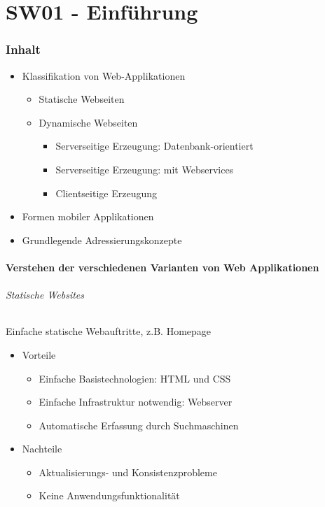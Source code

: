 \part{SW01 - Einführung}
\section{Inhalt}
\begin{itemize}[noitemsep,topsep=0pt,leftmargin=*]
    \item Klassifikation von Web-Applikationen
    \begin{itemize}[noitemsep,topsep=0pt,leftmargin=*]
        \item Statische Webseiten
        \item Dynamische Webseiten
        \begin{itemize}[noitemsep,topsep=0pt,leftmargin=*]
            \item Serverseitige Erzeugung: Datenbank-orientiert
            \item Serverseitige Erzeugung: mit Webservices
            \item Clientseitige Erzeugung
        \end{itemize}
    \end{itemize}
    \item Formen mobiler Applikationen
    \item Grundlegende Adressierungskonzepte
\end{itemize}

\subsection{Verstehen der verschiedenen Varianten von Web Applikationen}
\paragraph*{Statische Websites}Einfache statische Webauftritte, z.B. Homepage
\begin{itemize}[noitemsep,topsep=0pt,leftmargin=*]
    \item Vorteile
    \begin{itemize}[noitemsep,topsep=0pt,leftmargin=*]
        \item Einfache Basistechnologien: HTML und CSS
        \item Einfache Infrastruktur notwendig: Webserver
        \item Automatische Erfassung durch Suchmaschinen
    \end{itemize}
    \item Nachteile
    \begin{itemize}[noitemsep,topsep=0pt,leftmargin=*]
        \item Aktualisierungs- und Konsistenzprobleme
        \item Keine Anwendungsfunktionalität
    \end{itemize}
\end{itemize}

